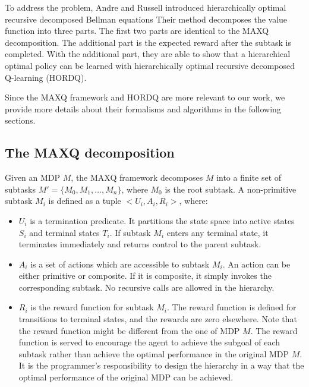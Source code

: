 To address the problem,
Andre and Russell \cite{Andre02, HORDQ} introduced hierarchically optimal recursive decomposed Bellman equations
Their method decomposes the value function into three parts. The first two parts are identical to the MAXQ decomposition.
The additional part is the expected reward after the subtask is completed.
With the additional part, they are able to show that a hierarchical optimal policy can be learned with hierarchically
optimal recursive decomposed Q-learning (HORDQ).

Since the MAXQ framework and HORDQ are more relevant to our work,
we provide more details about their formalisms and algorithms in the following sections.

\subsection{The MAXQ decomposition}

\begin{definition}
    Given an MDP $M$, the MAXQ framework decomposes $M$ into a finite
    set of subtasks $M' = \{M_0, M_1, \dots, M_n\}$, where $M_0$ is the root subtask. 
    A non-primitive subtask $M_i$ is defined as a tuple $<U_i, A_i, R_i>$, where:
    \begin{itemize}
    \item $U_i$ is a termination predicate. It partitions the state space into active states $S_i$ and
                terminal states $T_i$. If subtask $M_i$ enters any terminal state, it terminates immediately
                and returns control to the parent subtask. 
    \item $A_i$ is a set of actions which are accessible to subtask $M_i$. An action can be either primitive or composite.
                If it is composite, it simply invokes the corresponding subtask. No recursive calls 
                are allowed in the hierarchy.
    \item $R_i$ is the reward function for subtask $M_i$. The reward function is defined for transitions to terminal states, and the rewards are zero elsewhere. Note
        that the reward function might be different from the one of MDP $M$. The reward function is served to encourage the agent to achieve 
        the subgoal of each subtask rather than achieve the optimal performance in the original MDP $M$. It is the programmer's responsibility
        to design the hierarchy in a way that the optimal performance of the original MDP can be achieved.
    \end{itemize}
\end{definition}

